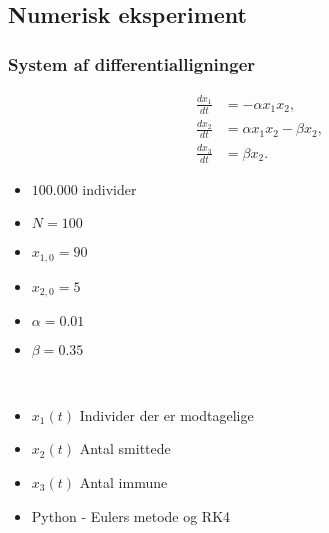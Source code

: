 \subsection{Numerisk eksperiment}
\begin{frame}
\frametitle{System af differentialligninger}
\begin{minipage}[t]{0.50\textwidth}
\begin{align}
\frac{dx_1}{dt} & = - \alpha x_1 x_2, \\
\frac{dx_2}{dt} & = \alpha x_1 x_2 - \beta x_2 , \\
\frac{dx_3}{dt} & = \beta x_2.
\end{align}
\end{minipage}
\begin{minipage}[t]{0.45\textwidth}
\begin{itemize}
\item $100.000$ individer 
\item $N = 100$ 
\item $x_{1,0} = 90$ 
\item $x_{2,0} = 5 $
\item $\alpha = 0.01$ 
\item $\beta = 0.35$
\end{itemize}
\phantom{H}
\end{minipage}
\\
\begin{itemize}
\item $x_1(t)$ Individer der er modtagelige 
\item $x_2(t)$ Antal smittede 
\item $x_3(t)$ Antal immune 
\item Python - Eulers metode og RK4
\end{itemize}
\end{frame}
